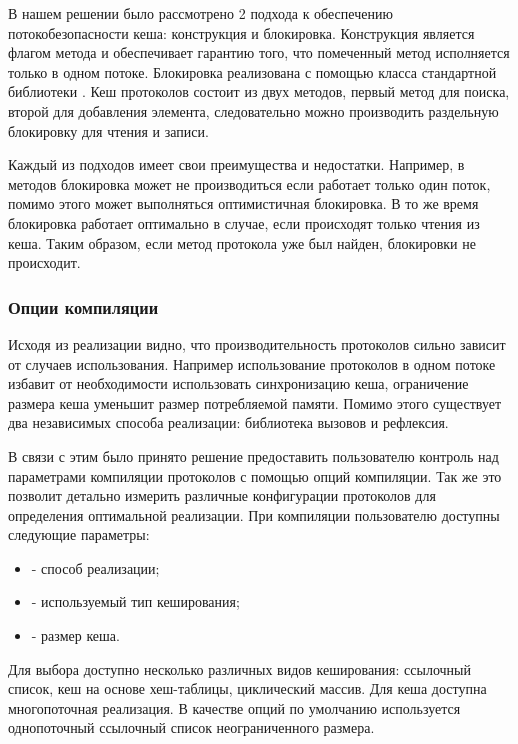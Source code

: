 В нашем решении было рассмотрено 2 подхода к обеспечению потокобезопасности кеша: \cite{jvm:sync} конструкция и  блокировка. Конструкция  является флагом метода и обеспечивает гарантию того, что помеченный метод исполняется только в одном потоке. Блокировка  реализована с помощью класса стандартной библиотеки \cite{jvm:rwlock}. Кеш протоколов состоит из двух методов, первый метод для поиска, второй для добавления элемента, следовательно можно производить раздельную блокировку для чтения и записи.

Каждый из подходов имеет свои преимущества и недостатки. Например, в  методов блокировка может не производиться если работает только один поток, помимо этого может выполняться оптимистичная блокировка. В то же время  блокировка работает оптимально в случае, если происходят только чтения из кеша. Таким образом, если метод протокола уже был найден, блокировки не происходит.

\subsubsection{Опции компиляции}

Исходя из реализации видно, что производительность протоколов сильно зависит от случаев использования. Например использование протоколов в одном потоке избавит от необходимости использовать синхронизацию кеша, ограничение размера кеша уменьшит размер потребляемой памяти. Помимо этого существует два независимых способа реализации: библиотека вызовов и рефлексия.

В связи с этим было принято решение предоставить пользователю контроль над параметрами компиляции протоколов с помощью опций компиляции. Так же это позволит детально измерить различные конфигурации протоколов для определения оптимальной реализации. При компиляции пользователю доступны следующие параметры:
\begin{itemize}
  \item {} - способ реализации;
  \item {} - используемый тип кеширования;
  \item {} - размер кеша.
\end{itemize}

Для выбора доступно несколько различных видов кеширования: ссылочный список,  кеш\cite{Johnson:1994:LOH:645920.672996} на основе хеш-таблицы, циклический массив. Для кеша доступна многопоточная реализация. В качестве опций по умолчанию используется однопоточный ссылочный список неограниченного размера.
